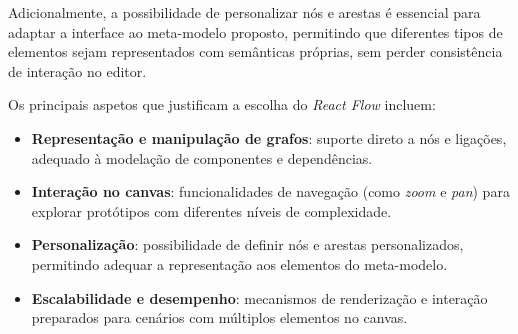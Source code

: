 Adicionalmente, a possibilidade de personalizar nós e arestas é essencial para adaptar a interface ao meta-modelo proposto, permitindo que diferentes tipos de elementos sejam representados com semânticas próprias, sem perder consistência de interação no editor.

Os principais aspetos que justificam a escolha do \textit{React Flow} incluem:
\begin{itemize}
  \item \textbf{Representação e manipulação de grafos}: suporte direto a nós e ligações, adequado à modelação de componentes e dependências.
  \item \textbf{Interação no canvas}: funcionalidades de navegação (como \textit{zoom} e \textit{pan}) para explorar protótipos com diferentes níveis de complexidade.
  \item \textbf{Personalização}: possibilidade de definir nós e arestas personalizados, permitindo adequar a representação aos elementos do meta-modelo.
  \item \textbf{Escalabilidade e desempenho}: mecanismos de renderização e interação preparados para cenários com múltiplos elementos no canvas.
\end{itemize}
